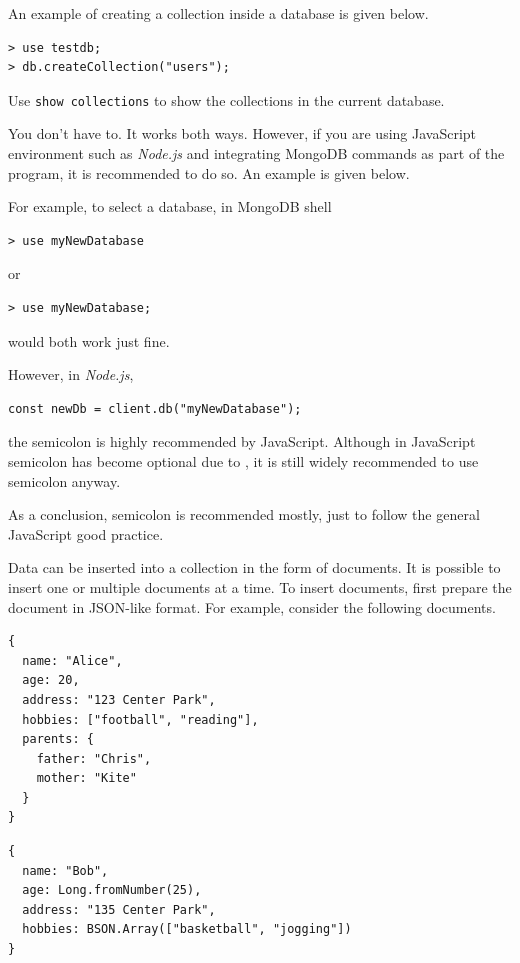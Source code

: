 An example of creating a collection inside a database is given below.
\begin{lstlisting}
> use testdb;
> db.createCollection("users");
\end{lstlisting}
Use \verb|show collections| to show the collections in the current database.

\begin{shortbox}

You don't have to. It works both ways. However, if you are using JavaScript environment such as \textit{Node.js} and integrating MongoDB commands as part of the program, it is recommended to do so. An example is given below.

For example, to select a database, in MongoDB shell
\begin{lstlisting}
> use myNewDatabase
\end{lstlisting}
or
\begin{lstlisting}
> use myNewDatabase;
\end{lstlisting}
would both work just fine. 

However, in \textit{Node.js},
\begin{lstlisting}
const newDb = client.db("myNewDatabase");
\end{lstlisting}
the semicolon is highly recommended by JavaScript. Although in JavaScript semicolon has become optional due to , it is still widely recommended to use semicolon anyway.

As a conclusion, semicolon is recommended mostly, just to follow the general JavaScript good practice. 
\end{shortbox}

Data can be inserted into a collection in the form of documents. It is possible to insert one or multiple documents at a time. To insert documents, first prepare the document in JSON-like format. For example, consider the following documents.
\begin{lstlisting}
{
  name: "Alice",
  age: 20,
  address: "123 Center Park",
  hobbies: ["football", "reading"],
  parents: {
    father: "Chris",
    mother: "Kite"
  }
}
\end{lstlisting}
\begin{lstlisting}
{
  name: "Bob",
  age: Long.fromNumber(25),
  address: "135 Center Park",
  hobbies: BSON.Array(["basketball", "jogging"])
}
\end{lstlisting}

